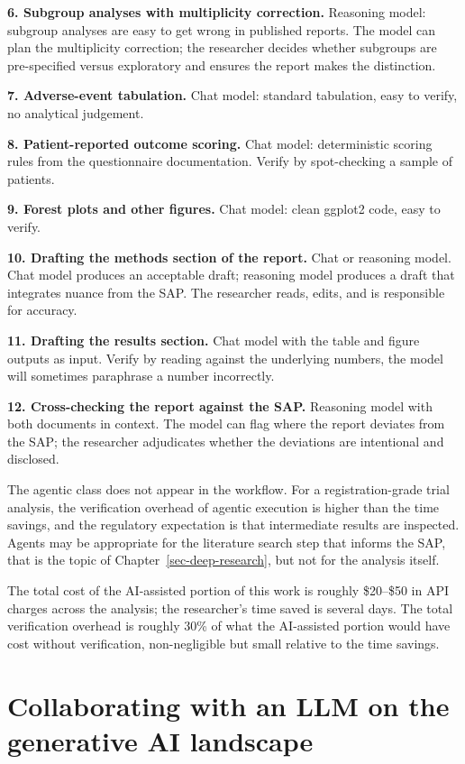 \documentclass[
  letterpaper,
  11pt]{scrbook}
\begin{document}
\textbf{6. Subgroup analyses with multiplicity correction.} Reasoning
model: subgroup analyses are easy to get wrong in published reports. The
model can plan the multiplicity correction; the researcher decides
whether subgroups are pre-specified versus exploratory and ensures the
report makes the distinction.

\textbf{7. Adverse-event tabulation.} Chat model: standard tabulation,
easy to verify, no analytical judgement.

\textbf{8. Patient-reported outcome scoring.} Chat model: deterministic
scoring rules from the questionnaire documentation. Verify by
spot-checking a sample of patients.

\textbf{9. Forest plots and other figures.} Chat model: clean ggplot2
code, easy to verify.

\textbf{10. Drafting the methods section of the report.} Chat or
reasoning model. Chat model produces an acceptable draft; reasoning
model produces a draft that integrates nuance from the SAP. The
researcher reads, edits, and is responsible for accuracy.

\textbf{11. Drafting the results section.} Chat model with the table and
figure outputs as input. Verify by reading against the underlying
numbers, the model will sometimes paraphrase a number incorrectly.

\textbf{12. Cross-checking the report against the SAP.} Reasoning model
with both documents in context. The model can flag where the report
deviates from the SAP; the researcher adjudicates whether the deviations
are intentional and disclosed.

The agentic class does not appear in the workflow. For a
registration-grade trial analysis, the verification overhead of agentic
execution is higher than the time savings, and the regulatory
expectation is that intermediate results are inspected. Agents may be
appropriate for the literature search step that informs the SAP, that is
the topic of Chapter~\ref{sec-deep-research}, but not for the analysis
itself.

The total cost of the AI-assisted portion of this work is roughly
\$20--\$50 in API charges across the analysis; the researcher's time
saved is several days. The total verification overhead is roughly 30\%
of what the AI-assisted portion would have cost without verification,
non-negligible but small relative to the time savings.

\section{Collaborating with an LLM on the generative AI
landscape}\label{collaborating-with-an-llm-on-the-generative-ai-landscape}
\end{document}
